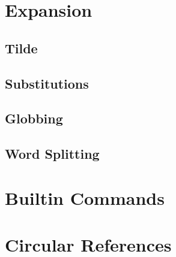 \section{Expansion}

\subsection{Tilde}
\subsection{Substitutions}
\subsection{Globbing}
\subsection{Word Splitting}

\section{Builtin Commands}

\section{Circular References}
\label{sec:circular-refs}




